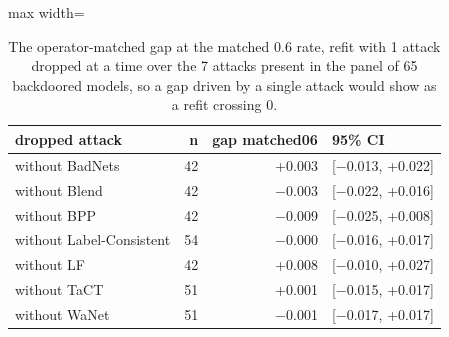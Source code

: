 \begin{table}[htbp]
\centering
\small
\caption{The operator-matched gap at the matched 0.6 rate, refit with 1 attack dropped at a time over the 7 attacks present in the panel of 65 backdoored models, so a gap driven by a single attack would show as a refit crossing 0.}
\label{tab:family-split-loo}
\begin{adjustbox}{max width=\linewidth}
\begin{tabular}{lrrl}
\toprule
dropped attack & n & gap matched06 & 95\% CI \\
\midrule
without BadNets & 42 & +0.003 & [$-$0.013, +0.022] \\
without Blend & 42 & $-$0.003 & [$-$0.022, +0.016] \\
without BPP & 42 & $-$0.009 & [$-$0.025, +0.008] \\
without Label-Consistent & 54 & $-$0.000 & [$-$0.016, +0.017] \\
without LF & 42 & +0.008 & [$-$0.010, +0.027] \\
without TaCT & 51 & +0.001 & [$-$0.015, +0.017] \\
without WaNet & 51 & $-$0.001 & [$-$0.017, +0.017] \\
\bottomrule
\end{tabular}
\end{adjustbox}
\end{table}

